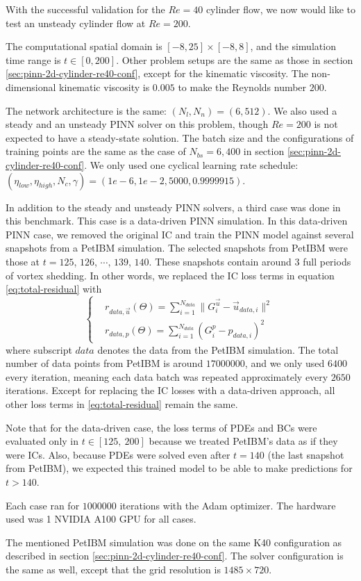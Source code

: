 With the successful validation for the $Re=40$ cylinder flow, we now would like to test an unsteady cylinder flow at $Re=200$.

The computational spatial domain is $[-8, 25]\times[-8, 8]$, and the simulation time range is $t\in[0, 200]$.
Other problem setups are the same as those in section \ref{sec:pinn-2d-cylinder-re40-conf}, except for the kinematic viscosity.
The non-dimensional kinematic viscosity is $0.005$ to make the Reynolds number $200$.

The network architecture is the same: $(N_l, N_n)=(6, 512)$.
We also used a steady and an unsteady PINN solver on this problem, though $Re=200$ is not expected to have a steady-state solution.
The batch size and the configurations of training points are the same as the case of $N_{bs}=6,400$ in section \ref{sec:pinn-2d-cylinder-re40-conf}.
We only used one cyclical learning rate schedule: $(\eta_{low}, \eta_{high}, N_c, \gamma)=(1e-6, 1e-2, 5000, 0.9999915)$.

In addition to the steady and unsteady PINN solvers, a third case was done in this benchmark.
This case is a data-driven PINN simulation.
In this data-driven PINN case, we removed the original IC and train the PINN model against several snapshots from a PetIBM simulation.
The selected snapshots from PetIBM were those at $t=125$, $126$, $\cdots$, $139$, $140$.
These snapshots contain around $3$ full periods of vortex shedding.
In other words, we replaced the IC loss terms in equation \eqref{eq:total-residual} with  
\begin{equation}\label{eq:data-driven-loss}
    \left\{
        \begin{aligned}
            &r_{data,\vec{u}}(\Theta) = \sum\limits_{i=1}^{N_{data}}\lVert G_i^{\vec{u}} - \vec{u}_{data, i}\rVert^2 \\
            &r_{data,p}(\Theta) = \sum\limits_{i=1}^{N_{data}}\left( G_i^{p} - p_{data, i} \right)^2
        \end{aligned}
    \right.
\end{equation}
where subscript $data$ denotes the data from the PetIBM simulation.
The total number of data points from PetIBM is around $\num{17000000}$, and we only used $\num{6400}$ every iteration, meaning each data batch was repeated approximately every $\num{2650}$ iterations.
Except for replacing the IC losses with a data-driven approach, all other loss terms in \eqref{eq:total-residual} remain the same.

Note that for the data-driven case, the loss terms of PDEs and BCs were evaluated only in $t\in[125,\ 200]$ because we treated PetIBM's data as if they were ICs.
Also, because PDEs were solved even after $t=140$ (the last snapshot from PetIBM), we expected this trained model to be able to make predictions for $t>140$.

Each case ran for $\num{1000000}$ iterations with the Adam optimizer.
The hardware used was 1 NVIDIA A100 GPU for all cases.

The mentioned PetIBM simulation was done on the same K40 configuration as described in section \ref{sec:pinn-2d-cylinder-re40-conf}.
The solver configuration is the same as well, except that the grid resolution is $1485\times 720$.
